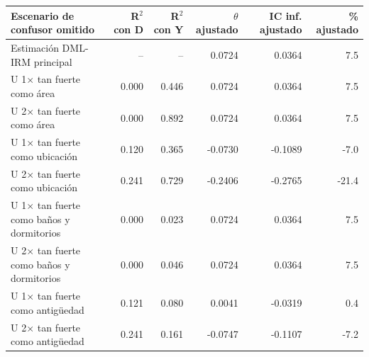 \begin{tabular}{lrrrrr}
\toprule
Escenario de confusor omitido & R$^2$ con D & R$^2$ con Y & $\theta$ ajustado & IC inf. ajustado & \% ajustado \\
\midrule
Estimación DML-IRM principal & -- & -- & 0.0724 & 0.0364 & 7.5 \\
U 1$\times$ tan fuerte como área & 0.000 & 0.446 & 0.0724 & 0.0364 & 7.5 \\
U 2$\times$ tan fuerte como área & 0.000 & 0.892 & 0.0724 & 0.0364 & 7.5 \\
U 1$\times$ tan fuerte como ubicación & 0.120 & 0.365 & -0.0730 & -0.1089 & -7.0 \\
U 2$\times$ tan fuerte como ubicación & 0.241 & 0.729 & -0.2406 & -0.2765 & -21.4 \\
U 1$\times$ tan fuerte como baños y dormitorios & 0.000 & 0.023 & 0.0724 & 0.0364 & 7.5 \\
U 2$\times$ tan fuerte como baños y dormitorios & 0.000 & 0.046 & 0.0724 & 0.0364 & 7.5 \\
U 1$\times$ tan fuerte como antigüedad & 0.121 & 0.080 & 0.0041 & -0.0319 & 0.4 \\
U 2$\times$ tan fuerte como antigüedad & 0.241 & 0.161 & -0.0747 & -0.1107 & -7.2 \\
\bottomrule
\end{tabular}